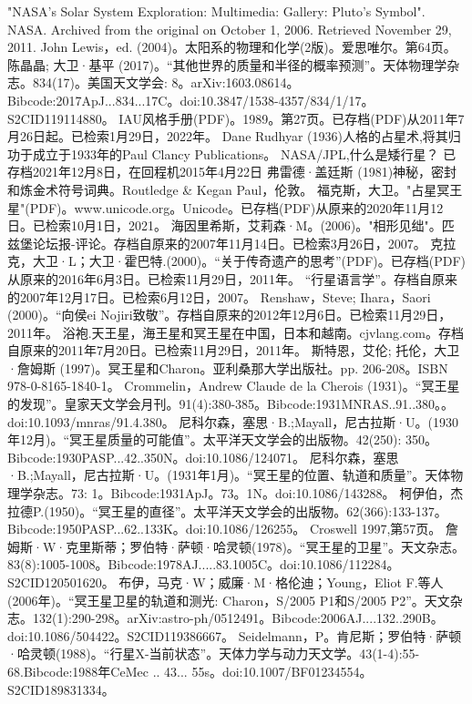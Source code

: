 \begin{enumerate}
 "NASA's Solar System Exploration: Multimedia: Gallery: Pluto's Symbol". NASA. Archived from the original on October 1, 2006. Retrieved November 29, 2011.
 John Lewis，ed. (2004)。太阳系的物理和化学(2版)。爱思唯尔。第64页。
 陈晶晶; 大卫·基平 (2017)。“其他世界的质量和半径的概率预测”。天体物理学杂志。834(17)。美国天文学会: 8。arXiv:1603.08614。Bibcode:2017ApJ...834...17C。doi:10.3847/1538-4357/834/1/17。S2CID119114880。 
 IAU风格手册(PDF)。1989。第27页。已存档(PDF)从2011年7月26日起。已检索1月29日，2022年。
 Dane Rudhyar (1936)人格的占星术,将其归功于成立于1933年的Paul Clancy Publications。
 NASA/JPL,什么是矮行星？ 已存档2021年12月8日，在回程机2015年4月22日
 弗雷德·盖廷斯 (1981)神秘，密封和炼金术符号词典。Routledge & Kegan Paul，伦敦。
 福克斯，大卫。"占星冥王星"(PDF)。www.unicode.org。Unicode。已存档(PDF)从原来的2020年11月12日。已检索10月1日，2021。
 海因里希斯，艾莉森·M。(2006)。"相形见绌"。匹兹堡论坛报-评论。存档自原来的2007年11月14日。已检索3月26日，2007。
 克拉克，大卫·L；大卫·霍巴特.(2000)。“关于传奇遗产的思考”(PDF)。已存档(PDF)从原来的2016年6月3日。已检索11月29日，2011年。
 “行星语言学”。存档自原来的2007年12月17日。已检索6月12日，2007。
 Renshaw，Steve; Ihara，Saori (2000)。“向侯ei Nojiri致敬”。存档自原来的2012年12月6日。已检索11月29日，2011年。
 浴袍.天王星，海王星和冥王星在中国，日本和越南。cjvlang.com。存档自原来的2011年7月20日。已检索11月29日，2011年。
 斯特恩，艾伦; 托伦，大卫·詹姆斯 (1997)。冥王星和Charon。亚利桑那大学出版社。pp. 206-208。ISBN 978-0-8165-1840-1。
 Crommelin，Andrew Claude de la Cherois (1931)。“冥王星的发现”。皇家天文学会月刊。91(4):380-385。Bibcode:1931MNRAS..91..380。。doi:10.1093/mnras/91.4.380。
 尼科尔森，塞思·B.;Mayall，尼古拉斯·U。(1930年12月)。“冥王星质量的可能值”。太平洋天文学会的出版物。42(250): 350。Bibcode:1930PASP...42..350N。doi:10.1086/124071。
 尼科尔森，塞思·B.;Mayall，尼古拉斯·U。(1931年1月)。“冥王星的位置、轨道和质量”。天体物理学杂志。73: 1。Bibcode:1931ApJ。73。1N。doi:10.1086/143288。
 柯伊伯，杰拉德P.(1950)。“冥王星的直径”。太平洋天文学会的出版物。62(366):133-137。Bibcode:1950PASP...62..133K。doi:10.1086/126255。
 Croswell 1997,第57页。
 詹姆斯·W·克里斯蒂；罗伯特·萨顿·哈灵顿(1978)。“冥王星的卫星”。天文杂志。83(8):1005-1008。Bibcode:1978AJ.....83.1005C。doi:10.1086/112284。S2CID120501620。 
 布伊，马克·W；威廉·M·格伦迪；Young，Eliot F.等人 (2006年)。“冥王星卫星的轨道和测光: Charon，S/2005 P1和S/2005 P2”。天文杂志。132(1):290-298。arXiv:astro-ph/0512491。Bibcode:2006AJ....132..290B。doi:10.1086/504422。S2CID119386667。 
 Seidelmann，P。肯尼斯；罗伯特·萨顿·哈灵顿(1988)。“行星X-当前状态”。天体力学与动力天文学。43(1-4):55-68.Bibcode:1988年CeMec .. 43... 55s。doi:10.1007/BF01234554。S2CID189831334。 

\end{enumerate}
